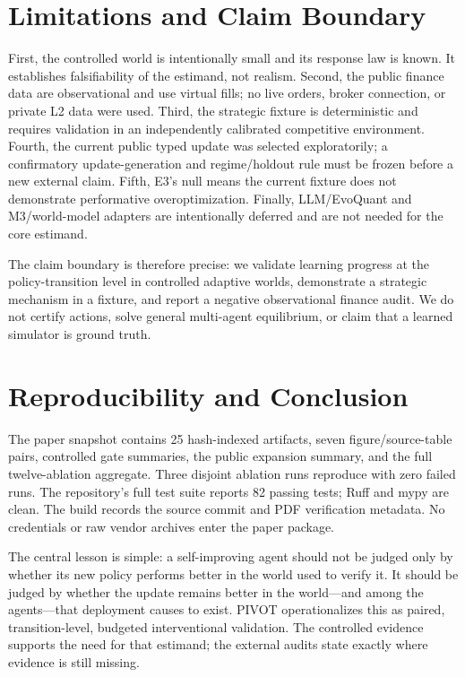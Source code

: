 \documentclass[10pt,twocolumn]{article}
\begin{document}
\section{Limitations and Claim Boundary}
First, the controlled world is intentionally small and its response law is
known. It establishes falsifiability of the estimand, not realism. Second, the
public finance data are observational and use virtual fills; no live orders,
broker connection, or private L2 data were used. Third, the strategic fixture
is deterministic and requires validation in an independently calibrated
competitive environment. Fourth, the current public typed update was selected
exploratorily; a confirmatory update-generation and regime/holdout rule must be
frozen before a new external claim. Fifth, E3's null means the current fixture
does not demonstrate performative overoptimization. Finally, LLM/EvoQuant and
M3/world-model adapters are intentionally deferred and are not needed for the
core estimand.

The claim boundary is therefore precise: we validate learning progress at the
policy-transition level in controlled adaptive worlds, demonstrate a
strategic mechanism in a fixture, and report a negative observational finance
audit. We do not certify actions, solve general multi-agent equilibrium, or
claim that a learned simulator is ground truth.

\section{Reproducibility and Conclusion}
The paper snapshot contains 25 hash-indexed artifacts, seven figure/source-table
pairs, controlled gate summaries, the public expansion summary, and the full
twelve-ablation aggregate. Three disjoint ablation runs reproduce with zero
failed runs. The repository's full test suite reports 82 passing tests; Ruff
and mypy are clean. The build records the source commit and PDF verification
metadata. No credentials or raw vendor archives enter the paper package.

The central lesson is simple: a self-improving agent should not be judged only
by whether its new policy performs better in the world used to verify it. It
should be judged by whether the update remains better in the world---and among
the agents---that deployment causes to exist. PIVOT operationalizes this as
paired, transition-level, budgeted interventional validation. The controlled
evidence supports the need for that estimand; the external audits state exactly
where evidence is still missing.
\end{document}
